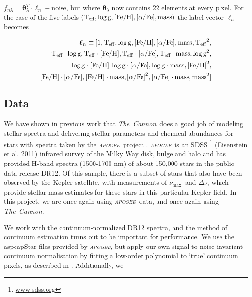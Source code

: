 \documentclass[12pt, preprint]{aastex}
\newcommand{\project}[1]{\textsl{#1}}
\newcommand{\tc}{\project{The~Cannon}}
\newcommand{\apogee}{\project{\textsc{apogee}}}
\newcommand{\apokasc}{\project{\textsc{apokasc}}}
\newcommand{\teff}{\mbox{$\rm T_{eff}$}}
\newcommand{\feh}{\mbox{$\rm [Fe/H]$}}
\newcommand{\alphafe}{\mbox{$\rm [\alpha/Fe]$}}
\newcommand{\logg}{\mbox{$\rm \log g$}}
\newcommand{\set}[1]{\bm{#1}}
\newcommand{\starlabel}{\ell}
\newcommand{\starlabelvec}{\set{\starlabel}}
\newcommand{\numax}{$\nu_{\max}$}
\newcommand{\deltanu}{$\Delta\nu$}
\begin{document}
$f_{n\lambda} =
\set{\theta}_\lambda^T \cdot \starlabelvec_n + \mbox{noise}$, 
but where $\set{\theta}_\lambda$ now contains 22 elements at every pixel. For the case of the five labels $(\teff , \logg , \feh, \alphafe, \mbox{mass})$ the label vector $\starlabelvec_n$
becomes  

\begin{equation}
\begin{split}
\starlabelvec_n \equiv  [1, \teff, \logg, \feh, \alphafe, \mbox{mass}, \teff^2, \\
 \teff\cdot\logg, \teff\cdot\feh, \teff\cdot\alphafe, \teff\cdot \mbox{mass},  \logg^2, \\
  \logg\cdot\feh, \logg\cdot\alphafe, \logg\cdot \mbox{mass}, \feh^2, \\
  \feh\cdot\alphafe, \feh\cdot \mbox{mass}, \alphafe^2, \alphafe\cdot \mbox{mass}, \mbox{mass}^2]
\end{split}
 \label{eq:quad}
\end{equation}



\subsection{Data}

We have shown in previous work \citep{Ness2015} that \tc\ does a good job
of modeling stellar spectra and delivering stellar parameters and
chemical abundances for stars with spectra taken by the \apogee\ project \citep{Majewski2012}.  \apogee\ is an SDSS \footnote{\url{www.sdss.org}} (Eisenstein et al. 2011) infrared survey of the Milky Way disk, bulge and halo and has provided H-band spectra (1500-1700 nm) of about 150,000 stars in the public data release DR12.  Of this sample, there is a subset of stars that also have been observed by the Kepler satellite, with measurements of \numax\ and \deltanu, which provide stellar mass estimates for these stars in this particular Kepler field.  In this project, we are once again using \apogee\ data, and once again
using \tc. %

We work with the continuum-normalized DR12 spectra, and the method of continuum
estimation turns out to be important for performance. We use the aspcapStar files provided by \apogee, but apply our own signal-to-noise invariant continuum normalisation by fitting a low-order polynomial to `true' continuum pixels, as described in \citet{Ness2015}. Additionally, we 
\end{document}
